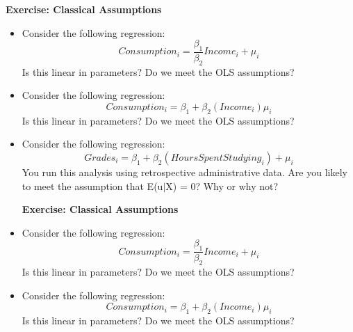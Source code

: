 \documentclass[11pt]{article}
\begin{document}
\indent \textbf{Exercise: Classical Assumptions}\\


\begin{itemize}
\item Consider the following regression: 
\begin{equation*}
Consumption_i = \frac{\beta_1}{\beta_2} Income_i + \mu_i
\end{equation*}
Is this linear in parameters? Do we meet the OLS assumptions?

\vspace{0.35in}

\item Consider the following regression: 
\begin{equation*}
Consumption_i = \beta_1 + \beta_2 (Income_i)\mu_i
\end{equation*}
Is this linear in parameters? Do we meet the OLS assumptions?

\vspace{0.35in}

\item Consider the following regression: 
\begin{equation*}
Grades_i = \beta_1 + \beta_2 (Hours Spent Studying_i) + \mu_i
\end{equation*}
You run this analysis using retrospective administrative data. Are you likely to meet the assumption that E(u$\mid$X) = 0? Why or why  not?
\vspace{0.35in}


 \textbf{Exercise: Classical Assumptions}\\

\item Consider the following regression: 
\begin{equation*}
Consumption_i = \frac{\beta_1}{\beta_2} Income_i + \mu_i
\end{equation*}
Is this linear in parameters? Do we meet the OLS assumptions?

\vspace{0.35in}

\item Consider the following regression: 
\begin{equation*}
Consumption_i = \beta_1 + \beta_2 (Income_i)\mu_i
\end{equation*}
Is this linear in parameters? Do we meet the OLS assumptions?


\vspace{0.35in}



\end{itemize}
\end{document}
